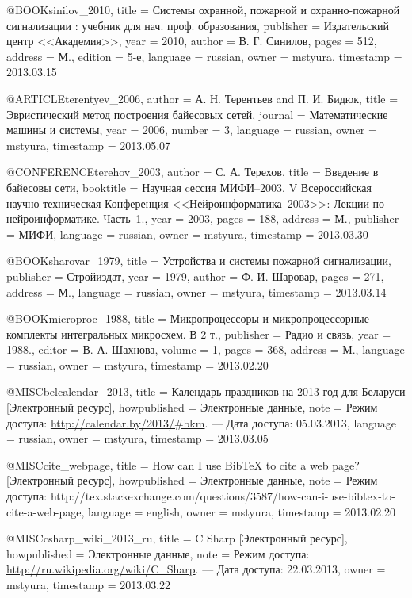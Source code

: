 @BOOK{sinilov_2010,
  title = {Системы охранной, пожарной и охранно-пожарной сигнализации : учебник
	для нач. проф. образования},
  publisher = {Издательский центр <<Академия>>},
  year = {2010},
  author = {В. Г. Синилов},
  pages = {512},
  address = {М.},
  edition = {5-е},
  language = {russian},
  owner = {mstyura},
  timestamp = {2013.03.15}
}

@ARTICLE{terentyev_2006,
  author = {А. Н. Терентьев and П. И. Бидюк},
  title = {Эвристический метод построения байесовых сетей},
  journal = {Математические машины и системы},
  year = {2006},
  number = {3},
  language = {russian},
  owner = {mstyura},
  timestamp = {2013.05.07}
}

@CONFERENCE{terehov_2003,
  author = {С. А. Терехов},
  title = {Введение в байесовы сети},
  booktitle = {Научная cессия МИФИ--2003. V Всероссийская научно-техническая Конференция
	<<Нейроинформатика--2003>>: Лекции по нейроинформатике. Часть~1.},
  year = {2003},
  pages = {188},
  address = {М.},
  publisher = {МИФИ},
  language = {russian},
  owner = {mstyura},
  timestamp = {2013.03.30}
}

@BOOK{sharovar_1979,
  title = {Устройства и системы пожарной сигнализации},
  publisher = {Стройиздат},
  year = {1979},
  author = {Ф. И. Шаровар},
  pages = {271},
  address = {М.},
  language = {russian},
  owner = {mstyura},
  timestamp = {2013.03.14}
}

@BOOK{microproc_1988,
  title = {Микропроцессоры и микропроцессорные комплекты интегральных микросхем.
	В 2 т.},
  publisher = {Радио и связь},
  year = {1988.},
  editor = {В. А. Шахнова},
  volume = {1},
  pages = {368},
  address = {М.},
  language = {russian},
  owner = {mstyura},
  timestamp = {2013.02.20}
}

@MISC{belcalendar_2013,
  title = {Календарь праздников на 2013 год для Беларуси [Электронный ресурс]},
  howpublished = {Электронные данные},
  note = {Режим доступа: \url{http://calendar.by/2013/\#bkm}. --- Дата доступа:
	05.03.2013},
  language = {russian},
  owner = {mstyura},
  timestamp = {2013.03.05}
}

@MISC{cite_webpage,
  title = {How can I use BibTeX to cite a web page? [Электронный ресурс]},
  howpublished = {Электронные данные},
  note = {Режим доступа: http://tex.stackexchange.com/questions/3587/how-can-i-use-bibtex-to-cite-a-web-page},
  language = {english},
  owner = {mstyura},
  timestamp = {2013.02.20}
}

@MISC{csharp_wiki_2013_ru,
  title = {C Sharp [Электронный ресурс]},
  howpublished = {Электронные данные},
  note = {Режим доступа: \url{http://ru.wikipedia.org/wiki/C\_Sharp}. --- Дата
	доступа: 22.03.2013},
  owner = {mstyura},
  timestamp = {2013.03.22}
}

